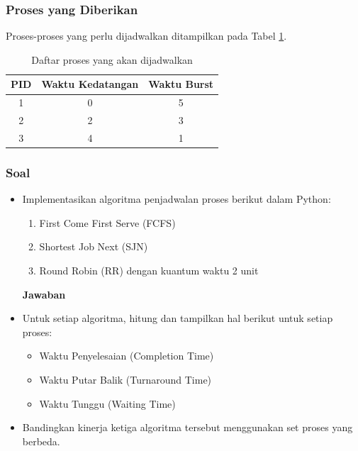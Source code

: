 \documentclass[12pt]{article}
\begin{document}
\subsubsection{Proses yang Diberikan}
Proses-proses yang perlu dijadwalkan ditampilkan pada Tabel \ref{tab:proses}.

\begin{table}[htbp]
    \centering
    \begin{tabular}{|c|c|c|}
        \hline
        PID & Waktu Kedatangan & Waktu Burst \\
        \hline
        1   & 0                & 5           \\
        2   & 2                & 3           \\
        3   & 4                & 1           \\
        \hline
    \end{tabular}
    \caption{Daftar proses yang akan dijadwalkan}
    \label{tab:proses}
\end{table}

\subsubsection{Soal}
\begin{itemize}
    \item Implementasikan algoritma penjadwalan proses berikut dalam Python:
        \begin{enumerate}
            \item First Come First Serve (FCFS)
            \item Shortest Job Next (SJN)
            \item Round Robin (RR) dengan kuantum waktu 2 unit
        \end{enumerate}
        
\textbf{Jawaban}
    \item Untuk setiap algoritma, hitung dan tampilkan hal berikut untuk setiap proses:
        \begin{itemize}
            \item Waktu Penyelesaian (Completion Time)
            \item Waktu Putar Balik (Turnaround Time)
            \item Waktu Tunggu (Waiting Time)
        \end{itemize}
    \item Bandingkan kinerja ketiga algoritma tersebut menggunakan set proses yang berbeda.
\end{itemize}
\end{document}
